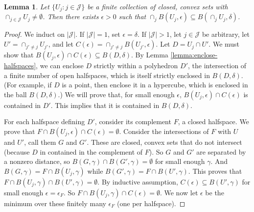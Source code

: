 \documentclass[12pt]{article}
\newtheorem{lemma}{Lemma}
\begin{document}
\begin{lemma} \label{lemma:thick-nonempty}
  Let $\{U_j : j \in \mathcal{J}\}$ be a finite collection of closed, convex sets with $\cap_{j\in\mathcal{J}} U_j \neq \emptyset$.
  Then there exists  $\epsilon > 0$ such that $\cap_j B(U_j,\epsilon) \subseteq B(\cap_j U_j, \delta)$.
\end{lemma}
\begin{proof}
  We induct on $|\mathcal{J}|$.
  If $|\mathcal{J}|=1$, set $\epsilon = \delta$.
  If $|\mathcal{J}|>1$, let $j\in\mathcal{J}$ be arbitrary, let $U' = \cap_{j'\neq j} U_{j'}$, and let $C(\epsilon) = \cap_{j' \neq j} B(U_{j'},\epsilon)$.
  Let $D = U_j \cap U'$.
  We must show that $B(U_j,\epsilon) \cap C(\epsilon) \subseteq B(D,\delta)$.
  By Lemma \ref{lemma:enclose-halfspaces}, we can enclose $D$ strictly within a polyhedron $D'$, the intersection of a finite number of open halfspaces, which is itself strictly enclosed in $B(D,\delta)$.
  (For example, if $D$ is a point, then enclose it in a hypercube, which is enclosed in the ball $B(D,\delta)$.)
  We will prove that, for small enough $\epsilon$, $B(U_j,\epsilon) \cap C(\epsilon)$ is contained in $D'$.
  This implies that it is contained in $B(D,\delta)$.

  For each halfspace defining $D'$, consider its complement $F$, a closed halfspace.
  We prove that $F \cap B(U_j,\epsilon) \cap C(\epsilon) = \emptyset$.
  Consider the intersections of $F$ with $U$ and $U'$, call them $G$ and $G'$.
  These are closed, convex sets that do not intersect (because $D$ in contained in the complement of $F$).
  So $G$ and $G'$ are separated by a nonzero distance, so $B(G,\gamma) \cap B(G',\gamma) = \emptyset$ for small enough $\gamma$.
  And $B(G,\gamma) = F \cap B(U_j,\gamma)$ while $B(G',\gamma) = F \cap B(U',\gamma)$.
  This proves that $F \cap B(U_j,\gamma) \cap B(U',\gamma) = \emptyset$.
  By inductive assumption, $C(\epsilon) \subseteq B(U',\gamma)$ for small enough $\epsilon = \epsilon_F$.
  So $F \cap B(U_j,\gamma) \cap C(\epsilon) = \emptyset$.
  We now let $\epsilon$ be the minimum over these finitely many $\epsilon_F$ (one per halfspace).
\end{proof}
\end{document}
